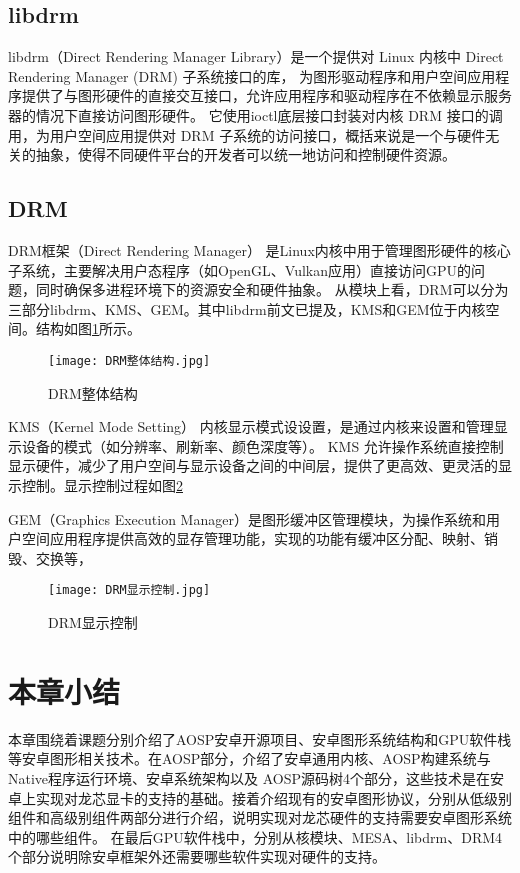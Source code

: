 \subsection{libdrm}
libdrm（Direct Rendering Manager Library）是一个提供对 Linux 内核中 Direct Rendering Manager (DRM) 子系统接口的库，
为图形驱动程序和用户空间应用程序提供了与图形硬件的直接交互接口，允许应用程序和驱动程序在不依赖显示服务器的情况下直接访问图形硬件。
它使用ioctl底层接口封装对内核 DRM 接口的调用，为用户空间应用提供对 DRM 子系统的访问接口，概括来说是一个与硬件无关的抽象，使得不同硬件平台的开发者可以统一地访问和控制硬件资源。

\subsection{DRM} 
DRM框架（Direct Rendering Manager） 是Linux内核中用于管理图形硬件的核心子系统，主要解决用户态程序（如OpenGL、Vulkan应用）直接访问GPU的问题，同时确保多进程环境下的资源安全和硬件抽象。
从模块上看，DRM可以分为三部分libdrm、KMS、GEM。其中libdrm前文已提及，KMS和GEM位于内核空间。结构如图\ref{fig:DRM整体结构}所示。

\begin{figure}[H]
  \centering
  \texttt{[image: DRM整体结构.jpg]}
  \caption{DRM整体结构}
  \label{fig:DRM整体结构}
\end{figure}

KMS（Kernel Mode Setting） 内核显示模式设设置，是通过内核来设置和管理显示设备的模式（如分辨率、刷新率、颜色深度等）。
KMS 允许操作系统直接控制显示硬件，减少了用户空间与显示设备之间的中间层，提供了更高效、更灵活的显示控制。显示控制过程如图\ref{fig:DRM显示控制}

GEM（Graphics Execution Manager）是图形缓冲区管理模块，为操作系统和用户空间应用程序提供高效的显存管理功能，实现的功能有缓冲区分配、映射、销毁、交换等，

\begin{figure}[H]
  \centering
  \texttt{[image: DRM显示控制.jpg]}
  \caption{DRM显示控制}
  \label{fig:DRM显示控制}
\end{figure}

\section{本章小结}
本章围绕着课题分别介绍了AOSP安卓开源项目、安卓图形系统结构和GPU软件栈等安卓图形相关技术。在AOSP部分，介绍了安卓通用内核、AOSP构建系统与Native程序运行环境、安卓系统架构以及
AOSP源码树4个部分，这些技术是在安卓上实现对龙芯显卡的支持的基础。接着介绍现有的安卓图形协议，分别从低级别组件和高级别组件两部分进行介绍，说明实现对龙芯硬件的支持需要安卓图形系统中的哪些组件。
在最后GPU软件栈中，分别从核模块、MESA、libdrm、DRM4个部分说明除安卓框架外还需要哪些软件实现对硬件的支持。

